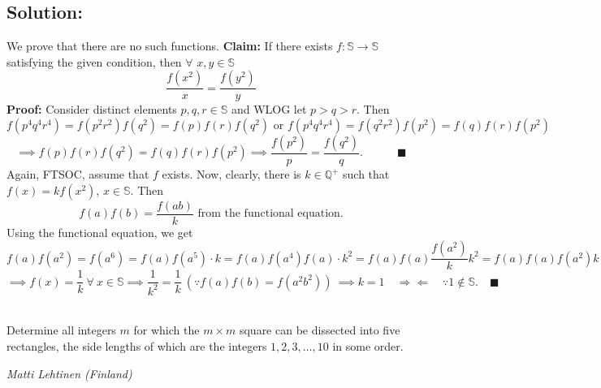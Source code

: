 \documentclass[fontsize=9pt]{scrartcl}
\begin{document}
	\subsection*{Solution:}
	We prove that there are no such functions.
	\newline
	\textbf{\textsf{Claim:}} If there exists $f \colon \mathbb{S}\to \mathbb{S}$ satisfying
	the given condition, then $\forall$ $x,y \in \mathbb{S}$
	\[
		\frac{f(x^{2})}{x} = \frac{f(y^{2})}{y}
	\]
	\textbf{\textsf{Proof:}} Consider distinct elements $p,q,r \in \mathbb{S}$ and
	WLOG let $p>q>r$. Then
	\[
		f(p^{4}q^{4}r^{4}) = f(p^{2}r^{2})f(q^{2}) = f(p)f(r)f(q^{2}) \text{ or }f(p^{4}
		q^{4}r^{4})= f(q^{2}r^{2})f(p^{2}) = f(q)f(r)f(p^{2})
	\]
	\[
		\implies f(p)f(r)f(q^{2})= f(q)f(r)f(p^{2}) \implies \frac{f(p^{2})}{p} = \frac{f(q^{2})}{q}
		. \quad \quad \quad \blacksquare
	\]
	Again, FTSOC, assume that $f$ exists. Now, clearly, there is $k \in \mathbb{Q}^{+}$
	such that $f(x) = kf(x^{2})$, $x \in \mathbb{S}$. Then
	\[
		f(a)f(b) = \frac{f(ab)}{k}\text{ from the functional equation.}
	\]
	Using the functional equation, we get
	\[
		f(a)f(a^{2}) = f(a^{6}) = f(a)f(a^{5}) \cdot k = f(a) f(a^{4}) f(a) \cdot k^{2}
		=f(a)f(a)\frac{f(a^{2})}{k} k^{2} =f(a)f(a)f(a^{2})k
	\]
	\[
		\implies f(x) = \frac{1}{k} \ \forall \ x\in \mathbb{S}\implies \frac{1}{k^{2}}
		= \frac{1}{k} \ (\because f(a)f(b) = f(a^{2}b^{2})) \ \implies k=1 \quad \Rightarrow
		\Leftarrow \quad \because 1 \not \in \mathbb{S}. \quad \blacksquare
	\]
	~\\
	\begin{tcolorbox}
		[colback=white!5!white,colframe=purple!75!white,title=\textsf{Problem 3: (EGMO
		2013)}, opacityback=1] Determine all integers $m$ for which the $m \times m$
		square can be dissected into five rectangles, the side lengths of which are
		the integers $1,2,3,\ldots,10$ in some order.
	\end{tcolorbox}
	\hfill \emph{Matti Lehtinen (Finland)}
\end{document}
